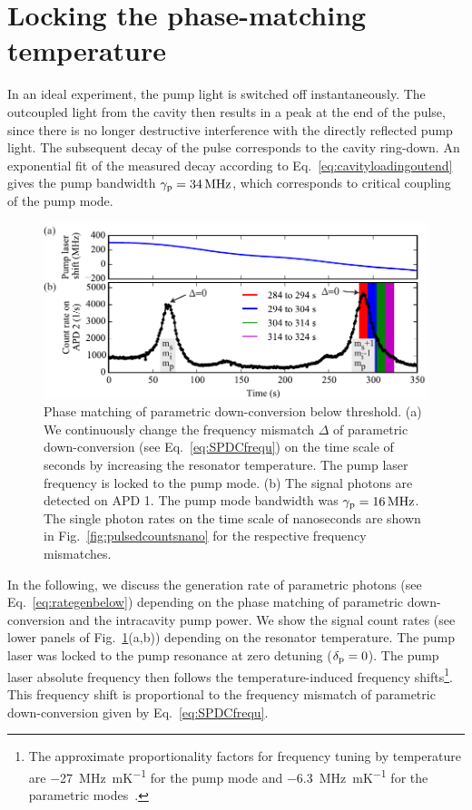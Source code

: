 \documentclass[aps,pra,showpacs,reprint,onecolumn,notitlepage]{revtex4-1}
\newcommand{\tx}[1]{\textnormal{#1}}
\begin{document}
\section{Locking the phase-matching temperature}
In an ideal experiment, the pump light is switched off instantaneously. The outcoupled light from the cavity then results in a peak at the end of the pulse, since there is no longer destructive interference with the directly reflected pump light. The subsequent decay of the pulse corresponds to the cavity ring-down. An exponential fit of the measured decay according to Eq.~\ref{eq:cavityloadingoutend} gives the pump bandwidth $\gamma_\tx{p}=\SI{34}{\MHz}$, which corresponds to critical coupling of the pump mode.
\begin{figure}[htb]
  \centering
  \includegraphics[scale=0.8]{pictures/exp_WGMR_detuning/SPDC_detuning_tempshift_1.pdf} 
\caption{Phase matching of parametric down-conversion below threshold. (a) We continuously change the frequency mismatch $\Delta$ of parametric down-conversion (see Eq.~\ref{eq:SPDCfrequ}) on the time scale of seconds by increasing the resonator temperature. The pump laser frequency is locked to the pump mode. (b) The signal photons are detected on APD 1. The pump mode bandwidth was $\gamma_\tx{p}=\SI{16}{\MHz}$. The single photon rates on the time scale of nanoseconds are shown in Fig.~\ref{fig:pulsedcountsnano} for the respective frequency mismatches.}
	\label{fig:pulsedcounts}
\end{figure}

In the following, we discuss the generation rate of parametric photons (see Eq.~\ref{eq:rategenbelow}) depending on the phase matching of parametric down-conversion and the intracavity pump power. We show the signal count rates (see lower panels of Fig.~\ref{fig:pulsedcounts}(a,b)) depending on the resonator temperature. The pump laser was locked to the pump resonance at zero detuning ($\delta_\tx{p}=0$). The pump laser absolute frequency then follows the temperature-induced frequency shifts\footnote{The approximate proportionality factors for frequency tuning by temperature are \SI{-27}{\MHz\per\milli\kelvin} for the pump mode and \SI{-6.3}{\MHz\per\milli\kelvin} for the parametric modes~\cite{Schlarb1994,Weis1985}.}. This frequency shift is proportional to the frequency mismatch of parametric down-conversion given by Eq.~\ref{eq:SPDCfrequ}. 
\end{document}
